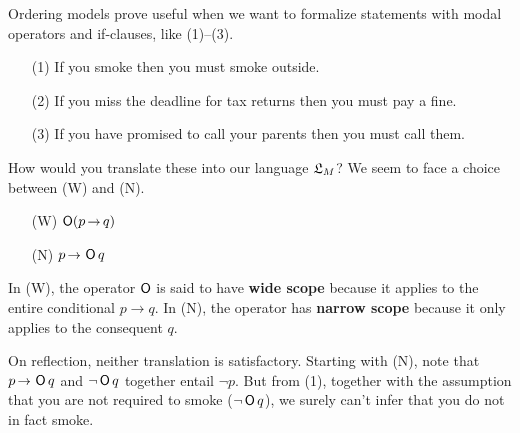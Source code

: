 
Ordering models prove useful when we want to formalize statements with
modal operators and if-clauses, like (1)--(3).

\begin{itemize}[leftmargin=10mm]
\itemsep-1mm
\item[(1)] If you smoke then you must smoke outside.
\item[(2)] If you miss the deadline for tax returns then you must pay a fine.
\item[(3)] If you have promised to call your parents then you must call them.
\end{itemize}
%
How would you translate these into our language $\mathfrak{L}_M$? We seem to face a choice
between (W) and (N).
\begin{itemize}[leftmargin=10mm]
\itemsep-1mm
\item[(W)] $\Ob(p \to q)$
\item[(N)] $p \to \Ob q$
\end{itemize}
In (W), the operator $\operatorname{\mathsf{O}}$ is said to have \textbf{wide scope} because it
applies to the entire conditional $p \to q$. In (N), the operator has
\textbf{narrow scope} because it only applies to the consequent $q$.

On reflection, neither translation is satisfactory. Starting with (N), note that
$p \to \Ob q$ and $\neg \operatorname{\mathsf{O}} q$ together entail $\neg p$. But from (1), together
with the assumption that you are not required to smoke ($\neg \operatorname{\mathsf{O}} q$), we surely
can't infer that you do not in fact smoke.

%

